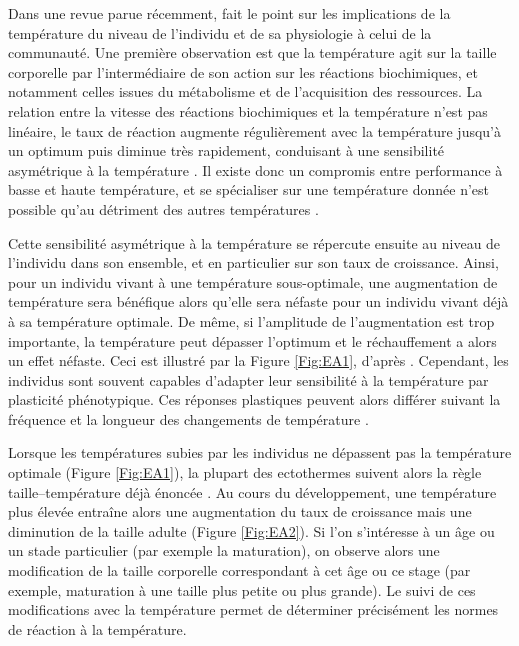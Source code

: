 Dans une revue parue récemment, \textcite{ohlberger2013a} fait le point sur les
implications de la température du niveau de l'individu et de sa physiologie à
celui de la communauté. Une première observation est que la température agit sur
la taille corporelle par l'intermédiaire de son action sur les réactions
biochimiques, et notamment celles issues du métabolisme et de l'acquisition des
ressources. La relation entre la vitesse des réactions biochimiques et la
température n'est pas linéaire, le taux de réaction augmente régulièrement avec
la température jusqu'à un optimum puis diminue très rapidement, conduisant à une
sensibilité asymétrique à la température \autocites{hochachka2002a,
angilletta2009a}. Il existe donc un compromis entre performance à basse et haute
température, et se spécialiser sur une température donnée n'est possible qu'au
détriment des autres températures \autocites{angilletta2009a}.

Cette sensibilité asymétrique à la température se répercute ensuite au niveau
de l'individu dans son ensemble, et en particulier sur son taux de croissance.
Ainsi, pour un individu vivant à une température sous-optimale, une augmentation
de température sera bénéfique alors qu'elle sera néfaste pour un individu vivant
déjà à sa température optimale. De même, si l'amplitude de l'augmentation est
trop importante, la température peut dépasser l'optimum et le réchauffement a
alors un effet néfaste. Ceci est illustré par la Figure
\ref{Fig:EA1}, d'après \textcites{ohlberger2013a}. Cependant, les individus sont
souvent capables d'adapter leur sensibilité à la température par plasticité
phénotypique. Ces réponses plastiques peuvent alors différer suivant la
fréquence et la longueur des changements de température
\autocites{angilletta2009a, huey1999a}.

Lorsque les températures subies par les individus ne dépassent pas la
température optimale (Figure \ref{Fig:EA1}), la plupart des ectothermes suivent
alors la règle taille--température déjà énoncée \autocite{atkinson1994a}. Au
cours du développement, une température plus élevée entraîne alors une augmentation du
taux de croissance mais une diminution de la taille adulte (Figure
\ref{Fig:EA2}).
Si l'on s'intéresse à un âge ou un stade particulier (par exemple la
maturation), on observe alors une modification de la taille corporelle
correspondant à cet âge ou ce stage (par exemple, maturation à une taille plus
petite ou plus grande). Le suivi de ces modifications avec la
température permet de déterminer précisément les normes de réaction à la
température.

